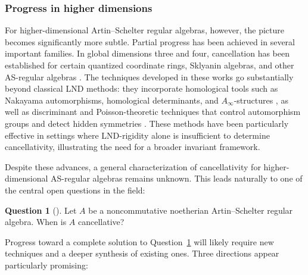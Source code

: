 \documentclass{amsart}
\theoremstyle{plain}
\numberwithin{theorem}{section}
\numberwithin{equation}{theorem}
\theoremstyle{definition}
\newtheorem{question}[theorem]{Question}
\begin{document}
\subsubsection*{Progress in higher dimensions}

For higher-dimensional Artin--Schelter regular algebras, however, the picture becomes significantly more subtle. Partial progress has been achieved in several important families. In global dimensions three and four, cancellation has been established for certain quantized coordinate rings, Sklyanin algebras, and other AS-regular algebras \cite{ LMZ,TVZ}. The techniques developed in these works go substantially beyond classical LND methods: they incorporate homological tools such as Nakayama automorphisms, homological determinants, and $A_\infty$-structures \cite{LPWZ, MU1, MU2}, as well as discriminant and Poisson-theoretic techniques that control automorphism groups and detect hidden symmetries \cite{CYZ1, CYZ2, CPWZ1, CPWZ2,NTY}. These methods have been particularly effective in settings where LND-rigidity alone is insufficient to determine cancellativity, illustrating the need for a broader invariant framework.



Despite these advances, a general characterization of cancellativity for higher-dimensional AS-regular algebras remains unknown. This leads naturally to one of the central open questions in the field:

\begin{question}[{\cite[Question 0.3]{BellZhang2017}}]
\label{q:nc-cancel}
Let $A$ be a noncommutative noetherian Artin--Schelter regular algebra. When is $A$ cancellative?
\end{question}



Progress toward a complete solution to Question~\ref{q:nc-cancel} will likely require new techniques and a deeper synthesis of existing ones. Three directions appear particularly promising:
\end{document}
